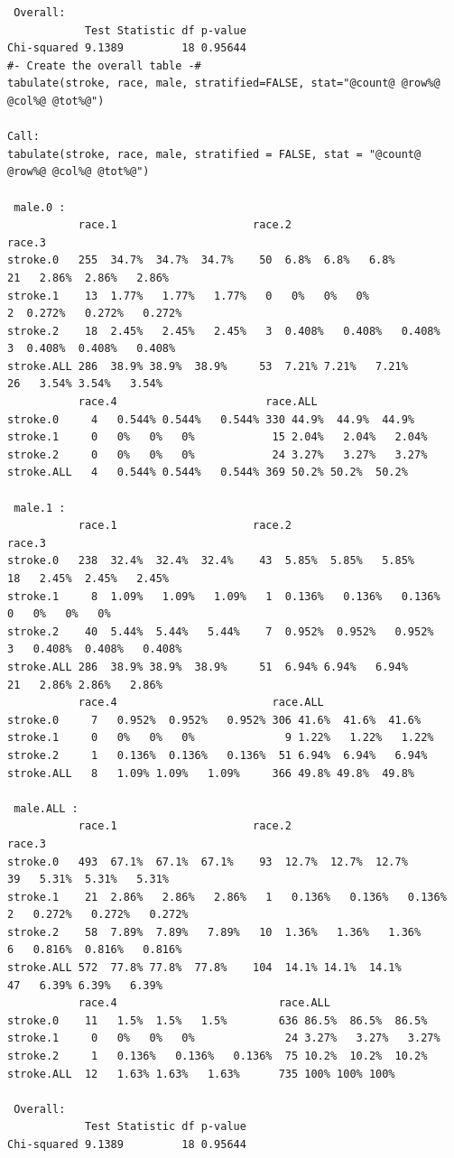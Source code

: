 \documentclass[11pt,letterpaper,fleqn]{report}
\begin{document}
{\begin{verbatim}
 Overall:  
            Test Statistic df p-value
Chi-squared 9.1389         18 0.95644
#- Create the overall table -#
tabulate(stroke, race, male, stratified=FALSE, stat="@count@ @row%@ @col%@ @tot%@")

Call:
tabulate(stroke, race, male, stratified = FALSE, stat = "@count@ @row%@ @col%@ @tot%@")

 male.0 : 
           race.1                     race.2                        race.3                       
stroke.0   255  34.7%  34.7%  34.7%    50  6.8%  6.8%   6.8%         21   2.86%  2.86%   2.86%   
stroke.1    13  1.77%   1.77%   1.77%   0   0%   0%   0%              2  0.272%   0.272%   0.272%
stroke.2    18  2.45%   2.45%   2.45%   3  0.408%   0.408%   0.408%   3  0.408%  0.408%   0.408% 
stroke.ALL 286  38.9% 38.9%  38.9%     53  7.21% 7.21%   7.21%       26   3.54% 3.54%   3.54%    
           race.4                       race.ALL                 
stroke.0     4   0.544% 0.544%   0.544% 330 44.9%  44.9%  44.9%  
stroke.1     0   0%   0%   0%            15 2.04%   2.04%   2.04%
stroke.2     0   0%   0%   0%            24 3.27%   3.27%   3.27%
stroke.ALL   4   0.544% 0.544%   0.544% 369 50.2% 50.2%  50.2%   

 male.1 : 
           race.1                     race.2                        race.3                       
stroke.0   238  32.4%  32.4%  32.4%    43  5.85%  5.85%   5.85%      18   2.45%  2.45%   2.45%   
stroke.1     8  1.09%   1.09%   1.09%   1  0.136%   0.136%   0.136%   0   0%   0%   0%           
stroke.2    40  5.44%  5.44%   5.44%    7  0.952%  0.952%   0.952%    3   0.408%  0.408%   0.408%
stroke.ALL 286  38.9% 38.9%  38.9%     51  6.94% 6.94%   6.94%       21   2.86% 2.86%   2.86%    
           race.4                        race.ALL                 
stroke.0     7   0.952%  0.952%   0.952% 306 41.6%  41.6%  41.6%  
stroke.1     0   0%   0%   0%              9 1.22%   1.22%   1.22%
stroke.2     1   0.136%  0.136%   0.136%  51 6.94%  6.94%   6.94% 
stroke.ALL   8   1.09% 1.09%   1.09%     366 49.8% 49.8%  49.8%   

 male.ALL : 
           race.1                     race.2                         race.3                        
stroke.0   493  67.1%  67.1%  67.1%    93  12.7%  12.7%  12.7%        39   5.31%  5.31%   5.31%    
stroke.1    21  2.86%   2.86%   2.86%   1   0.136%   0.136%   0.136%   2   0.272%   0.272%   0.272%
stroke.2    58  7.89%  7.89%   7.89%   10  1.36%   1.36%   1.36%       6   0.816%  0.816%   0.816% 
stroke.ALL 572  77.8% 77.8%  77.8%    104  14.1% 14.1%  14.1%         47   6.39% 6.39%   6.39%     
           race.4                         race.ALL                 
stroke.0    11   1.5%  1.5%   1.5%        636 86.5%  86.5%  86.5%  
stroke.1     0   0%   0%   0%              24 3.27%   3.27%   3.27%
stroke.2     1   0.136%   0.136%   0.136%  75 10.2%  10.2%  10.2%  
stroke.ALL  12   1.63% 1.63%   1.63%      735 100% 100% 100%       

 Overall:  
            Test Statistic df p-value
Chi-squared 9.1389         18 0.95644
\end{verbatim}}
\end{document}
